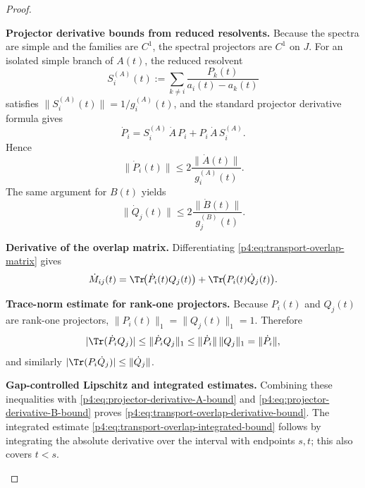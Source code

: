 \documentclass[12pt,a4paper]{article}
\begin{document}
\begin{proof}
\begin{proofsteps}

\item \textbf{Projector derivative bounds from reduced resolvents.}
Because the spectra are simple and the families are $C^1$, the spectral projectors are $C^1$ on $J$.
For an isolated simple branch of $A(t)$, the reduced resolvent
\[
S_i^{(A)}(t):=\sum_{k\neq i}\frac{P_k(t)}{a_i(t)-a_k(t)}
\]
satisfies $\|S_i^{(A)}(t)\|=1/g_i^{(A)}(t)$, and the standard projector derivative formula gives
\begin{equation}
\label{p4:eq:projector-derivative-A}
\dot P_i
=
S_i^{(A)}\,\dot A\,P_i + P_i\,\dot A\,S_i^{(A)}.
\end{equation}
Hence
\begin{equation}
\label{p4:eq:projector-derivative-A-bound}
\|\dot P_i(t)\|
\le
2\frac{\|\dot A(t)\|}{g_i^{(A)}(t)}.
\end{equation}
The same argument for $B(t)$ yields
\begin{equation}
\label{p4:eq:projector-derivative-B-bound}
\|\dot Q_j(t)\|
\le
2\frac{\|\dot B(t)\|}{g_j^{(B)}(t)}.
\end{equation}


\item \textbf{Derivative of the overlap matrix.}
Differentiating \eqref{p4:eq:transport-overlap-matrix} gives
\[
\dot M_{ij}(t)
=
\Tr\!\bigl(\dot P_i(t)Q_j(t)\bigr)
+
\Tr\!\bigl(P_i(t)\dot Q_j(t)\bigr).
\]

\item \textbf{Trace-norm estimate for rank-one projectors.}
Because $P_i(t)$ and $Q_j(t)$ are rank-one projectors, $\|P_i(t)\|_1=\|Q_j(t)\|_1=1$.
Therefore
\[
|\Tr(\dot P_iQ_j)|
\le
\|\dot P_iQ_j\|_1
\le
\|\dot P_i\|\,\|Q_j\|_1
=
\|\dot P_i\|,
\]
and similarly $|\Tr(P_i\dot Q_j)|\le \|\dot Q_j\|$.

\item \textbf{Gap-controlled Lipschitz and integrated estimates.}
Combining these inequalities with \eqref{p4:eq:projector-derivative-A-bound} and \eqref{p4:eq:projector-derivative-B-bound} proves \eqref{p4:eq:transport-overlap-derivative-bound}.
The integrated estimate \eqref{p4:eq:transport-overlap-integrated-bound}
follows by integrating the absolute derivative over the interval with
endpoints \(s,t\); this also covers \(t<s\).
\end{proofsteps}

\end{proof}
\end{document}
